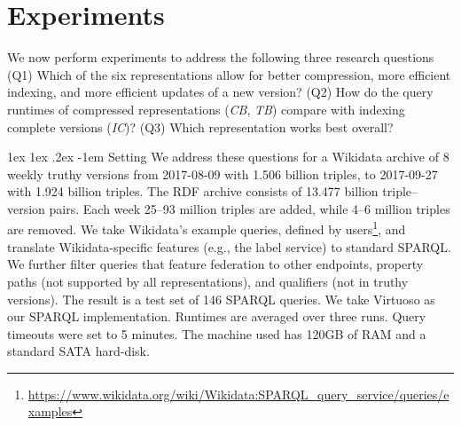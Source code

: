 \documentclass{llncs}
\makeatletter
\renewcommand\paragraph{\@startsection{paragraph}{4}{\z@}%
	{1ex \@plus1ex \@minus.2ex}%
	{-1em}%
	{\normalfont\normalsize\itshape}}
\makeatother
\begin{document}
%
%

\section{Experiments} 

We now perform experiments to address the following three research questions (Q1) Which of the six representations allow for better compression, more efficient indexing, and more efficient updates of a new version? (Q2) How do the query runtimes of compressed representations (\textit{CB}, \textit{TB}) compare with indexing complete versions (\textit{IC})? (Q3) Which representation works best overall? 

\paragraph{Setting} We address these questions for a Wikidata archive of 8 weekly truthy versions from 2017-08-09 with 1.506 billion triples, to 2017-09-27 with 1.924 billion triples. The RDF archive consists of 13.477 billion triple--version pairs. Each week 25--93 million triples are added, while 4--6 million triples are removed. We take Wikidata's example queries, defined by users\footnote{\url{https://www.wikidata.org/wiki/Wikidata:SPARQL_query_service/queries/examples}}, and translate Wikidata-specific features (e.g., the label service) to standard SPARQL. We further filter queries that feature federation to other endpoints, property paths (not supported by all representations), and qualifiers (not in truthy versions). The result is a test set of 146 SPARQL queries. We take Virtuoso as our SPARQL implementation. Runtimes are averaged over three runs. Query timeouts were set to 5 minutes. The machine used has 120GB of RAM and a standard SATA hard-disk.
\end{document}
